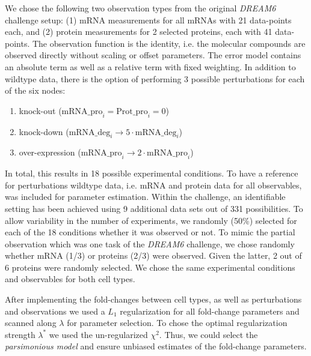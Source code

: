 \documentclass{bioinfo}
\begin{document}
We chose the following two observation types from the original \emph{DREAM6} challenge setup:
(1) mRNA measurements for all mRNAs with 21 data-points each, and (2) protein measurements for 2 selected proteins, each with 41 data-points.
The observation function is the identity, i.e. the molecular compounds are observed directly without scaling or offset parameters.
The error model contains an absolute term as well as a relative term with fixed weighting.
In addition to wildtype data, there is the option of performing 3 possible perturbations for each of the six nodes:
\begin{enumerate}
\item knock-out ($\text{mRNA\_pro}_i=\text{Prot\_pro}_i=0$)
\item knock-down ($\text{mRNA\_deg}_i\rightarrow 5\cdot \text{mRNA\_deg}_i$)
\item over-expression ($\text{mRNA\_pro}_i \rightarrow 2\cdot \text{mRNA\_pro}_i$)
\end{enumerate}
In total, this results in 18 possible experimental conditions.
To have a reference for perturbations wildtype data, i.e. mRNA and protein data for all observables, was included for parameter estimation.
Within the challenge, an identifiable setting has been achieved using 9 additional data sets out of 331 possibilities.
To allow variability in the number of experiments, we randomly (50\%) selected for each of the 18 conditions whether it was observed or not.
To mimic the partial observation which was one task of the \emph{DREAM6} challenge, we chose randomly whether mRNA (1/3) or proteins (2/3) were observed.
Given the latter, 2 out of 6 proteins were randomly selected.
We chose the same experimental conditions and observables for both cell types.

After implementing the fold-changes between cell types, as well as perturbations and observations we used a $L_1$ regularization for all fold-change parameters and scanned along $\lambda$ for parameter selection.
To chose the optimal regularization strength $\lambda^*$ we used the un-regularized $\chi^2$.
Thus, we could select the \emph{parsimonious model} and ensure unbiased estimates of the fold-change parameters.
\end{document}

